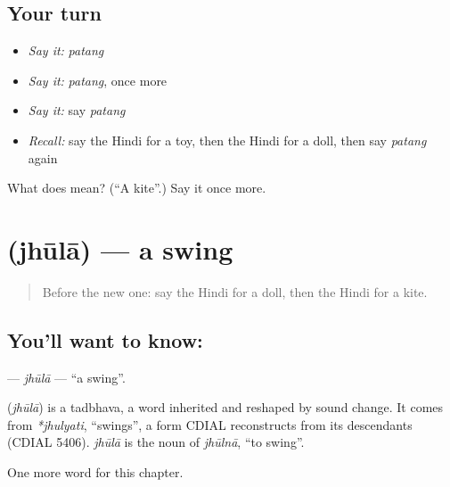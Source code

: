 \subsection*{Your turn}
\begin{itemize}
\raggedright
  \item \emph{Say it:} \emph{patang}
  \item \emph{Say it:} \emph{patang}, once more
  \item \emph{Say it:} say \emph{patang}
  \item \emph{Recall:} say the Hindi for a toy, then the Hindi for a doll, then say \emph{patang} again
\end{itemize}

\begin{tcolorbox}[breakable,colback=teal!4,colframe=teal!35!black,title={Before you move on}]
What does  mean? (\textquotedblleft{}A kite\textquotedblright{}.) Say it once more.
\end{tcolorbox}
\section[\texorpdfstring{\hi{झूला} (jhūlā)}{झूला (jhūlā)}]{ (jhūlā) — a swing}

\label{lesson:HI-C265-jhula}



\begin{quote}
Before the new one: say the Hindi for a doll, then the Hindi for a kite.
\end{quote}

\subsection*{You'll want to know: }
\textbf{} — \emph{jhūlā} — \textquotedblleft{}a swing\textquotedblright{}.

\begin{cousinweb}
\textbf{} (\emph{jhūlā}) is a tadbhava, a word inherited and reshaped by sound change. It comes from \emph{*jhulyati}, \textquotedblleft{}swings\textquotedblright{}, a form CDIAL reconstructs from its descendants (CDIAL 5406). \emph{jhūlā} is the noun of \emph{jhūlnā}, \textquotedblleft{}to swing\textquotedblright{}.
\end{cousinweb}

\begin{grammarlens}[title={What you've built}]
One more word for this chapter.
\end{grammarlens}

